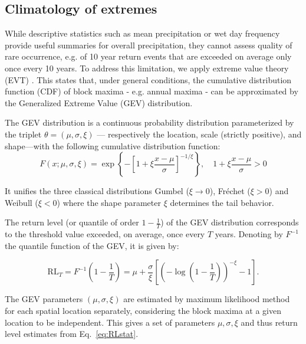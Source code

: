 ﻿\documentclass[hess, manuscript]{copernicus}
\providecommand{\DIFdelbegin}{} %
\providecommand{\DIFdelend}{} %
\begin{document}
\subsection{Climatology of extremes}\label{climatology}

\DIFdelbegin %

\DIFdelend While descriptive statistics such as mean precipitation or wet day frequency provide useful summaries for overall precipitation, they cannot assess quality of rare occurrence, e.g. of 10 year return events that are exceeded on average only once every 10 years. %
To address
this limitation, we apply extreme value theory (EVT) \citep{coles2001introduction}. This states that, under general conditions, the cumulative distribution function (CDF) of block maxima - e.g. annual maxima - can be approximated by the Generalized Extreme Value (GEV)
distribution.

The GEV distribution is a continuous
probability distribution parameterized by the triplet
\(\theta = (\mu, \sigma, \xi)\) --- respectively the location, scale
(strictly positive), and shape---with the following cumulative
distribution function: \[
F(x;\mu ,\sigma ,\xi) = \exp\left\{-\left[1 + \xi\frac{x - \mu}{\sigma}\right]^{-1/\xi}\right\}, \quad 1 + \xi\frac{x - \mu}{\sigma} > 0
\]

It unifies the three classical distributions Gumbel (\(\xi \to 0\)), Fréchet (\(\xi > 0\)) and Weibull (\(\xi < 0\)) where the shape parameter \(\xi\) determines the tail behavior.

The return level (or quantile of order \(1 - \tfrac{1}{T}\)) of the GEV
distribution corresponds to the threshold value exceeded, on
average, once every \(T\) years. 
Denoting by $F^{-1}$ the quantile function of the GEV, it is given by:

\begin{equation}\label{eq:RLstat}
\mathrm{RL}_{T}
= F^{-1}\!\left(1 - \frac{1}{T}\right)
= \mu + \frac{\sigma}{\xi}
\left[
\left(
-\log\!\left(1 - \frac{1}{T}\right)
\right)^{-\xi}
- 1
\right].
\end{equation}


The GEV parameters $(\mu,\sigma,\xi)$ are estimated by maximum likelihood method for each
spatial location separately, considering the block maxima at a given
location to be independent. This gives a set of parameters $\mu,\sigma,\xi$ and thus
return level estimates from Eq.~\ref{eq:RLstat}.
\end{document}
